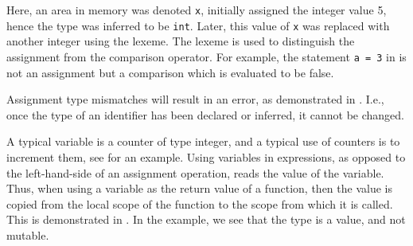 \documentclass[fsharpNotes.tex]{subfiles}
\begin{document}
%
%
Here, an area in memory was denoted \lstinline{x}, initially assigned the integer value 5, hence the type was inferred to be \lstinline|int|.  Later, this value of \lstinline{x} was replaced with another integer using the \lexeme{<-} lexeme. The \lexeme{<-} lexeme is used to distinguish the assignment from the comparison operator. For example, the statement \lstinline{a = 3} in  is not an assignment but a comparison which is evaluated to be false. 
%
%
%

Assignment type mismatches will result in an error, as demonstrated in . 
%
%
I.e., once the type of an identifier has been declared or inferred, it cannot be changed.

A typical variable is a counter of type integer, and a typical use of counters is to increment them, see  for an example.
%
%
Using variables in expressions, as opposed to the left-hand-side of an assignment operation, reads the value of the variable. Thus, when using a variable as the return value of a function, then the value is copied from the local scope of the function to the scope from which it is called. This is demonstrated in .
%
%
In the example,  we see that the type is a value, and not mutable.
\end{document}
